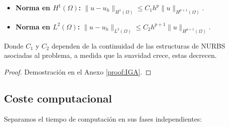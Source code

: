 \documentclass[11pt]{book}
\theoremstyle{plain} %
\theoremstyle{definition} %
\theoremstyle{definition} %
\begin{document}
\begin{itemize}
    \item \textbf{Norma en $H^1(\Omega)$:} $\| u - u_h \|_{H^1(\Omega)} \leq C_1 h^p \| u \|_{H^{p+1}(\Omega)}$.
    \item \textbf{Norma en $L^2(\Omega)$:} $\| u - u_h \|_{L^2(\Omega)} \le C_2 h^{p+1} \| u \|_{H^{p+1}(\Omega)}$.
\end{itemize}

Donde $C_1$ y $C_2$ dependen de la continuidad de las estructuras de NURBS asociadas al problema, a medida que la suavidad crece, estas decrecen.
\begin{proof}
    Demostración en el Anexo \ref{proof:IGA}.
\end{proof}

\vspace{-0.5cm}


\subsection{Coste computacional}

Separamos el tiempo de computación en sus fases independientes:
\end{document}
